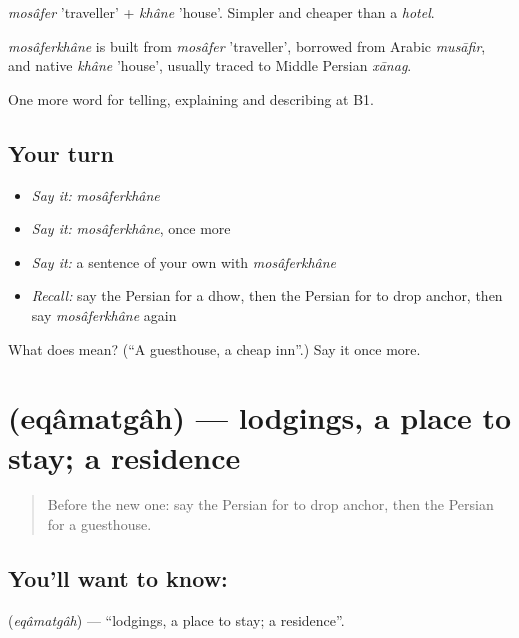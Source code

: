 \emph{mosâfer} 'traveller' + \emph{khâne} 'house'. Simpler and cheaper than a \emph{hotel}.

\begin{cousinweb}
\emph{mosâferkhâne} is built from \emph{mosâfer} 'traveller', borrowed from Arabic \emph{musāfir}, and native \emph{khâne} 'house', usually traced to Middle Persian \emph{xānag}.
\end{cousinweb}

\begin{grammarlens}[title={What you've built}]
One more word for telling, explaining and describing at B1.
\end{grammarlens}

\subsection*{Your turn}
\begin{itemize}
\raggedright
  \item \emph{Say it:} \emph{mosâferkhâne}
  \item \emph{Say it:} \emph{mosâferkhâne}, once more
  \item \emph{Say it:} a sentence of your own with \emph{mosâferkhâne}
  \item \emph{Recall:} say the Persian for a dhow, then the Persian for to drop anchor, then say \emph{mosâferkhâne} again
\end{itemize}

\begin{tcolorbox}[breakable,colback=teal!4,colframe=teal!35!black,title={Before you move on}]
What does  mean? (\textquotedblleft{}A guesthouse, a cheap inn\textquotedblright{}.) Say it once more.
\end{tcolorbox}
\section[\texorpdfstring{\fa{اقامتگاه} (eqâmatgâh)}{اقامتگاه (eqâmatgâh)}]{ (eqâmatgâh) — lodgings, a place to stay; a residence}

\label{lesson:FA-C437-eqamatgah}



\begin{quote}
Before the new one: say the Persian for to drop anchor, then the Persian for a guesthouse.
\end{quote}

\subsection*{You'll want to know: }
\textbf{} (\emph{eqâmatgâh}) — \textquotedblleft{}lodgings, a place to stay; a residence\textquotedblright{}.

